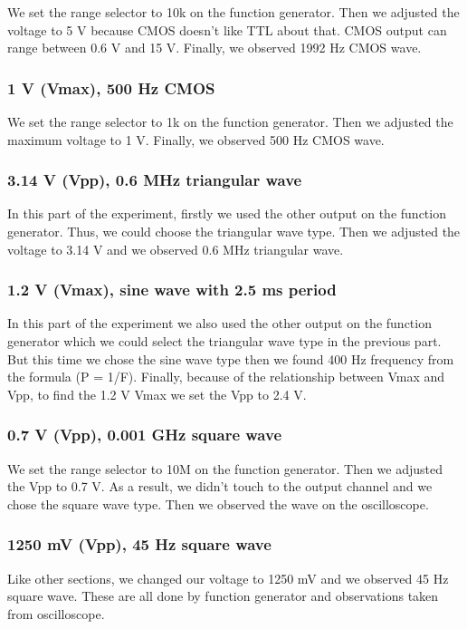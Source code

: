 \documentclass[pdftex,12pt,a4paper]{article}
\begin{document}
We set the range selector to 10k on the function generator. Then we adjusted the voltage to 5 V because CMOS doesn't like TTL about that. CMOS output can range between 0.6 V and 15 V. Finally, we observed 1992 Hz CMOS wave.

\subsubsection{1 V (Vmax), 500 Hz CMOS}

We set the range selector to 1k on the function generator. Then we adjusted the maximum voltage to 1 V. Finally, we observed 500 Hz CMOS wave.

\subsubsection{3.14 V (Vpp), 0.6 MHz triangular wave}

In this part of the experiment, firstly we used the other output on the function generator. Thus, we could choose the triangular wave type. Then we adjusted the voltage to 3.14 V and we observed 0.6 MHz triangular wave.
\subsubsection{1.2 V (Vmax), sine wave with 2.5 ms period}

In this part of the experiment we also used the other output on the function generator which we could select the triangular wave type in the previous part. But this time we chose the sine wave type then we found 400 Hz frequency from the formula (P = 1/F). Finally, because of the relationship between Vmax and Vpp, to find the 1.2 V Vmax we set the Vpp to 2.4 V.
\subsubsection{0.7 V (Vpp), 0.001 GHz square wave}

We set the range selector to 10M on the function generator. Then we adjusted the Vpp to 0.7 V. As a result, we didn't touch to the output channel and we chose the square wave type. Then we
observed the wave on the oscilloscope.

\subsubsection{1250 mV (Vpp), 45 Hz square wave}
Like other sections, we changed our voltage to 1250 mV and we observed 45 Hz square wave. These are all done by function generator and observations taken from oscilloscope.
\end{document}
